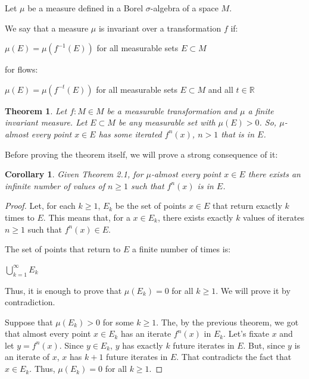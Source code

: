 \documentclass[a4paper,12pt] {article}
\newtheorem{theorem}{Theorem}[section]
\newtheorem{corollary}{Corollary}[section]
\begin{document}
Let $\mu$ be a measure defined in a Borel $\sigma$-algebra of a space $M$.

 We say that a measure $\mu$ is invariant over a transformation $f$ if:

\begin{center}
    $\mu(E) = \mu(f^{-1}(E))$ for all measurable sets $E \subset M$
\end{center}

 for flows:

\begin{center}
    $\mu(E) = \mu(f^{-t}(E))$ for all measurable sets $E \subset M$ and all $t \in \mathbb{R}$
\end{center}

\begin{theorem}\label{thm:main}
Let $f : M \in M$ be a measurable transformation and $\mu$ a finite invariant measure. Let $E \subset M$ be any measurable set with $\mu(E) > 0$. So, $\mu$-almost every point $x \in E$ has some iterated $f^n(x)$, $n>1$ that is in $E$.
\end{theorem}

 Before proving the theorem itself, we will prove a strong consequence of it:

\begin{corollary}
    Given Theorem 2.1, for $\mu$-almost every point $x \in E$ there exists an infinite number of values of $n\geq1$ such that $f^n(x)$ is in $E$.
\end{corollary}

\begin{proof} Let, for each $k\geq1$, $E_k$ be the set of points $x \in E$ that return exactly $k$ times to $E$. This means that, for a $x \in E_k$, there exists exactly $k$ values of iterates $n\geq1$ such that $f^n(x) \in E$.

 The set of points that return to $E$ a finite number of times is:

\begin{center}
    $\displaystyle \bigcup_{k=1}^\infty E_k$
\end{center}

 Thus, it is enough to prove that $\mu(E_k) = 0$ for all $k\geq 1$. We will prove it by contradiction.

 Suppose that $\mu(E_k) > 0$ for some $k\geq1$. The, by the previous theorem, we got that almost every point $x \in E_k$ has an iterate $f^n(x)$ in $E_k$. Let's fixate $x$ and let $y = f^n(x)$. Since $y \in E_k$, $y$ has exactly $k$ future iterates in $E$. But, since $y$ is an iterate of $x$, $x$ has $k+1$ future iterates in $E$. That contradicts the fact that $x \in E_k$. Thus, $\mu(E_k) = 0$ for all $k\geq1.$ 
\end{proof}
\end{document}
